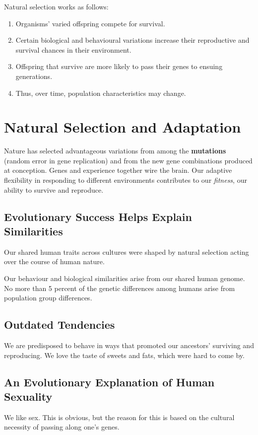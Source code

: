 \documentclass[12pt]{article}
\begin{document}
Natural selection works as follows:
\begin{enumerate}
\item Organisms' varied offspring compete for survival.
\item Certain biological and behavioural variations increase their reproductive and survival chances in their environment.
\item Offspring that survive are more likely to pass their genes to ensuing generations.
\item Thus, over time, population characteristics may change.
\end{enumerate}

\section*{Natural Selection and Adaptation}
Nature has selected advantageous variations from among the \textbf{mutations} (random error in gene replication) and from the new gene combinations produced at conception. Genes and experience together wire the brain. Our adaptive flexibility in responding to different environments contributes to our \textit{fitness}, our ability to survive and reproduce.

\subsection*{Evolutionary Success Helps Explain Similarities}
Our shared human traits across cultures were shaped by natural selection acting over the course of human nature.

Our behaviour and biological similarities arise from our shared human genome. No more than 5 percent of the genetic differences among humans arise from population group differences.

\subsection*{Outdated Tendencies}
We are predisposed to behave in ways that promoted our ancestors' surviving and reproducing. We love the taste of sweets and fats, which were hard to come by.

\subsection*{An Evolutionary Explanation of Human Sexuality}
We like sex. This is obvious, but the reason for this is based on the cultural necessity of passing along one's genes.
\end{document}
